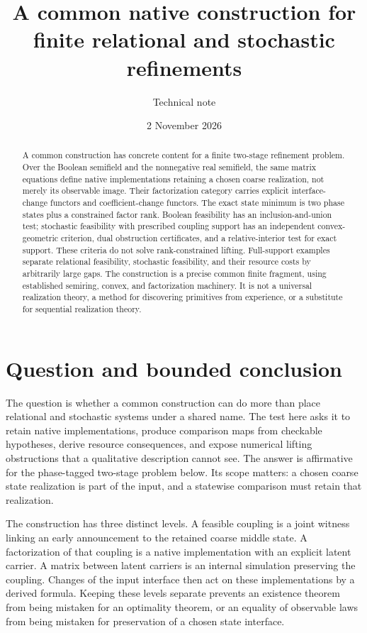 \documentclass[11pt]{article}
\title{A common native construction for finite relational and stochastic refinements}
\author{Technical note}
\date{2 November 2026}
\theoremstyle{remark}
\begin{document}
\maketitle

\begin{abstract}
A common construction has concrete content for a finite two-stage refinement problem. Over the Boolean semifield and the nonnegative real semifield, the same matrix equations define native implementations retaining a chosen coarse realization, not merely its observable image. Their factorization category carries explicit interface-change functors and coefficient-change functors. The exact state minimum is two phase states plus a constrained factor rank. Boolean feasibility has an inclusion-and-union test; stochastic feasibility with prescribed coupling support has an independent convex-geometric criterion, dual obstruction certificates, and a relative-interior test for exact support. These criteria do not solve rank-constrained lifting. Full-support examples separate relational feasibility, stochastic feasibility, and their resource costs by arbitrarily large gaps. The construction is a precise common finite fragment, using established semiring, convex, and factorization machinery. It is not a universal realization theory, a method for discovering primitives from experience, or a substitute for sequential realization theory.
\end{abstract}

\section{Question and bounded conclusion}

The question is whether a common construction can do more than place relational and stochastic systems under a shared name. The test here asks it to retain native implementations, produce comparison maps from checkable hypotheses, derive resource consequences, and expose numerical lifting obstructions that a qualitative description cannot see. The answer is affirmative for the phase-tagged two-stage problem below. Its scope matters: a chosen coarse state realization is part of the input, and a statewise comparison must retain that realization.

The construction has three distinct levels. A feasible coupling is a joint witness linking an early announcement to the retained coarse middle state. A factorization of that coupling is a native implementation with an explicit latent carrier. A matrix between latent carriers is an internal simulation preserving the coupling. Changes of the input interface then act on these implementations by a derived formula. Keeping these levels separate prevents an existence theorem from being mistaken for an optimality theorem, or an equality of observable laws from being mistaken for preservation of a chosen state interface.
\end{document}
